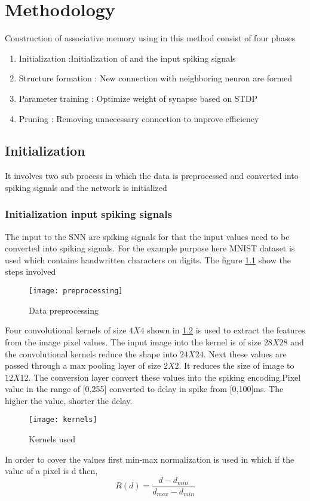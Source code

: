 \chapter{Methodology}%
Construction of associative memory using \Snn\cite{base} in this method consist of four phases
\begin{enumerate}
    \itemsep 0em
    \item Initialization :Initialization of \Snn and the input spiking signals
    \item Structure formation : New connection with neighboring neuron are formed
    \item Parameter training : Optimize weight of synapse based on STDP
    \item Pruning : Removing unnecessary connection to improve efficiency
\end{enumerate}
\section{Initialization}
It involves two sub process in which the data is preprocessed and converted
into spiking signals and the network is initialized
\subsection{Initialization input spiking signals}
The input to the SNN are spiking signals for that the input values need to be
converted into spiking signals. For the example purpose here MNIST dataset is
used which contains handwritten characters on digits. The figure
\ref{preprocessing} show the steps involved

\begin{figure}[h!]
    \centering
    \texttt{[image: preprocessing]}
    \caption{Data preprocessing}
    \label{preprocessing}
\end{figure}

Four convolutional kernels of size $4X4$ shown in \ref{kernel} is used to
extract the features from the image pixel values. The input image into the
kernel is of size $28X28$ and the convolutional kernels reduce the shape into
$24X24$. Next these values are passed through a max pooling layer of size
$2X2$. It reduces the size of image to $12X12$. The conversion layer convert
these values into the spiking encoding.Pixel value in the range of [0,255]
converted to delay in spike from [0,100]ms. The higher the value, shorter the
delay.
\begin{figure}[h!]
    \centering
    \texttt{[image: kernels]}
    \caption{Kernels used}
    \label{kernel}
\end{figure}
In order to cover the values first min-max normalization is used in which if
the value of a pixel is d then,
\begin{equation*}
    R(d)=\frac{d-d_{min}}{d_{max}-d_{min}}
\end{equation*}

